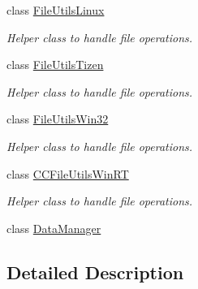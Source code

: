 \begin{DoxyCompactItemize}
class \hyperlink{classFileUtilsLinux}{File\+Utils\+Linux}
\begin{DoxyCompactList}\small\item\em Helper class to handle file operations. \end{DoxyCompactList}\item 
class \hyperlink{classFileUtilsTizen}{File\+Utils\+Tizen}
\begin{DoxyCompactList}\small\item\em Helper class to handle file operations. \end{DoxyCompactList}\item 
class \hyperlink{classFileUtilsWin32}{File\+Utils\+Win32}
\begin{DoxyCompactList}\small\item\em Helper class to handle file operations. \end{DoxyCompactList}\item 
class \hyperlink{classCCFileUtilsWinRT}{C\+C\+File\+Utils\+Win\+RT}
\begin{DoxyCompactList}\small\item\em Helper class to handle file operations. \end{DoxyCompactList}\item 
class \hyperlink{classDataManager}{Data\+Manager}
\end{DoxyCompactItemize}


\subsection{Detailed Description}

